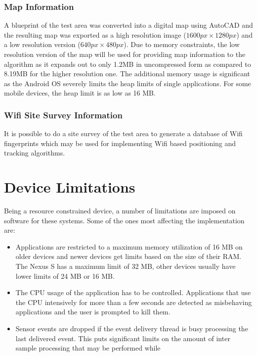 \subsubsection{Map Information}

A blueprint of the test area was converted into a digital map using AutoCAD
and the resulting map was exported as a high resolution image ($1600px \times 1280px$)
and a low resolution version ($640px \times 480px$). Due to memory constraints, 
the low resolution version of the map will be used for providing map information
to the algorithm as it expands out to only 1.2MB in uncompressed form as 
compared to 8.19MB for the higher resolution one. The additional memory 
usage is significant as the Android OS severely limits the heap limits of 
single applications. For some mobile devices, the heap limit is as low as
16 MB.

\subsubsection{Wifi Site Survey Information}

It is possible to do a site survey of the test area to generate a database of
Wifi fingerprints which may be used for implementing Wifi based positioning
and tracking algorithms.

\section{Device Limitations\label{sec:device_limitations}}

Being a resource constrained device, a number of limitations are imposed on 
software for these systems. Some of the ones most affecting the implementation
are:

\begin{itemize}
\item Applications are restricted to a maximum memory utilization of 16 MB on 
    older devices and newer devices get limits based on the size of their 
    RAM. The Nexus S has a maximum limit of 32 MB, other devices usually have
    lower limits of 24 MB or 16 MB.
\item The CPU usage of the application has to be controlled. Applications 
    that use the CPU intensively for more than a few seconds are detected as 
    misbehaving applications and the user is prompted to kill them.
\item Sensor events are dropped if the event delivery thread is busy processing
    the last delivered event. This puts significant limits on the 
    amount of inter sample processing that may be performed while 
\end{itemize}

